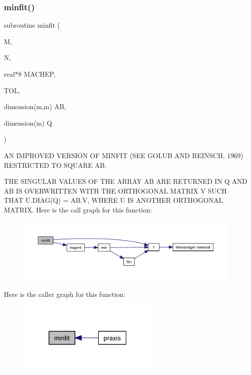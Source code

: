 \subsubsection{\texorpdfstring{minfit()}{minfit()}}
{\footnotesize\ttfamily subroutine minfit (\begin{DoxyParamCaption}\item[{}]{M,  }\item[{}]{N,  }\item[{real$\ast$8}]{M\+A\+C\+H\+EP,  }\item[{}]{T\+OL,  }\item[{dimension(m,m)}]{AB,  }\item[{dimension(m)}]{Q }\end{DoxyParamCaption})}



AN I\+M\+P\+R\+O\+V\+ED V\+E\+R\+S\+I\+ON OF M\+I\+N\+F\+IT (S\+EE G\+O\+L\+UB A\+ND R\+E\+I\+N\+S\+CH, 1969) R\+E\+S\+T\+R\+I\+C\+T\+ED TO S\+Q\+U\+A\+RE AB. 

T\+HE S\+I\+N\+G\+U\+L\+AR V\+A\+L\+U\+ES OF T\+HE A\+R\+R\+AY AB A\+RE R\+E\+T\+U\+R\+N\+ED IN Q A\+ND AB IS O\+V\+E\+R\+W\+R\+I\+T\+T\+EN W\+I\+TH T\+HE O\+R\+T\+H\+O\+G\+O\+N\+AL M\+A\+T\+R\+IX V S\+U\+CH T\+H\+AT U.\+D\+I\+A\+G(\+Q) = A\+B.\+V, W\+H\+E\+RE U IS A\+N\+O\+T\+H\+ER O\+R\+T\+H\+O\+G\+O\+N\+AL M\+A\+T\+R\+IX. Here is the call graph for this function\+:\nopagebreak
\begin{figure}[H]
\begin{center}
\leavevmode
\includegraphics[width=350pt]{praxis_8f_a4deca9e8eeda59dc7ea99e26c38d4a6d_cgraph}
\end{center}
\end{figure}
Here is the caller graph for this function\+:\nopagebreak
\begin{figure}[H]
\begin{center}
\leavevmode
\includegraphics[width=200pt]{praxis_8f_a4deca9e8eeda59dc7ea99e26c38d4a6d_icgraph}
\end{center}
\end{figure}
\mbox{\label{praxis_8f_ad363b84325df8361d0bce4a2456bef23}} 
